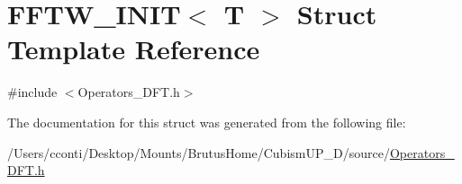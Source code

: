 \hypertarget{struct_f_f_t_w___i_n_i_t}{}\section{F\+F\+T\+W\+\_\+\+I\+N\+I\+T$<$ T $>$ Struct Template Reference}
\label{struct_f_f_t_w___i_n_i_t}


{\ttfamily \#include $<$Operators\+\_\+\+D\+F\+T.\+h$>$}



The documentation for this struct was generated from the following file\+:\begin{DoxyCompactItemize}
\item 
/\+Users/cconti/\+Desktop/\+Mounts/\+Brutus\+Home/\+Cubism\+U\+P\+\_\+D/source/\hyperlink{_operators___d_f_t_8h}{Operators\+\_\+\+D\+F\+T.\+h}\end{DoxyCompactItemize}
